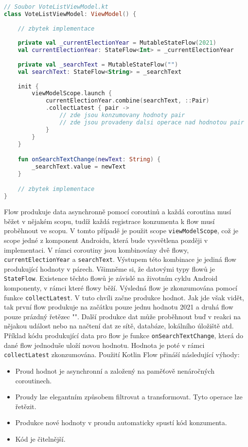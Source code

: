\begin{lstlisting}[caption={Příklad použití flow}, label={lst:flow-general}, tabsize=2, language=Kotlin]
	
// Soubor VoteListViewModel.kt
class VoteListViewModel: ViewModel() {
	
	// zbytek implementace
	
	private val _currentElectionYear = MutableStateFlow(2021)	
	val currentElectionYear: StateFlow<Int> = _currentElectionYear
	
	private val _searchText = MutableStateFlow("")
	val searchText: StateFlow<String> = _searchText
	
	init {
		viewModelScope.launch {
			currentElectionYear.combine(searchText, ::Pair)
			.collectLatest { pair ->
				// zde jsou konzumovany hodnoty pair
				// zde jsou provadeny dalsi operace nad hodnotou pair
			}
		}
	}

	fun onSearchTextChange(newText: String) {
		_searchText.value = newText
	}

	// zbytek implementace
}
\end{lstlisting}

\noindent Flow produkuje data asynchronně pomocí coroutinů a každá coroutina musí běžet v nějakém scopu, tudíž každá registrace konzumenta k flow musí proběhnout ve scopu. V tomto případě je použit scope \lstinline|viewModelScope|, což je scope jedné z komponent Androidu, která bude vysvětlena později v implementaci. V rámci coroutiny jsou kombinovány dvě flowy, \lstinline|currentElectionYear| \linebreak a \lstinline|searchText|. Výstupem této kombinace je jediná flow produkující hodnoty v párech. Všimněme si, že datovými typy flowů je \lstinline|StateFlow|. Existence těchto flowů je závislé na životním cyklu Android komponenty, v rámci které flowy běží. Výsledná flow je zkonzumována pomocí funkce \lstinline|collectLatest|. V tuto chvíli začne produkce hodnot. Jak jde však vidět, tak první flow produkuje na začátku pouze jednu hodnotu 2021 a druhá flow pouze prázdný řetězec "". Další produkce dat může proběhnout buď v reakci na nějakou událost nebo na načtení dat ze sítě, databáze, lokálního úložiště atd. Příklad kódu produkující data pro flow je funkce \lstinline|onSearchTextChange|, která do dané flow jednoduše uloží novou hodnotu. Hodnota je poté v rámci \lstinline|collectLatest| zkonzumována. Použití Kotlin Flow přináší následující výhody:

\begin{itemize}
	\item Proud hodnot je asynchronní a založený na paměťově nenáročných coroutinech.
	
	\item Proudy lze elegantním způsobem filtrovat a transformovat. Tyto operace lze řetězit.
	
	\item Produkce nové hodnoty v proudu automaticky spustí kód konzumenta.
	
	\item Kód je čitelnější.
\end{itemize}



